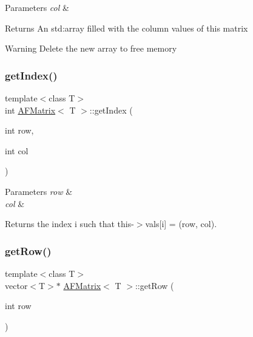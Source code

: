 \begin{DoxyParams}{Parameters}
{\em col} & \\
\hline
\end{DoxyParams}
\begin{DoxyReturn}{Returns}
An {\ttfamily std\+:array} filled with the column values of this matrix 
\end{DoxyReturn}
\begin{DoxyWarning}{Warning}
Delete the new array to free memory 
\end{DoxyWarning}
\mbox{\label{classAFMatrix_a582a394221722603e21b6571e95d69a7}} 
\subsubsection{\texorpdfstring{get\+Index()}{getIndex()}}
{\footnotesize\ttfamily template$<$class T$>$ \\
int \hyperlink{classAFMatrix}{A\+F\+Matrix}$<$ T $>$\+::get\+Index (\begin{DoxyParamCaption}\item[{int}]{row,  }\item[{int}]{col }\end{DoxyParamCaption})\hspace{0.3cm}{\ttfamily [inline]}}


\begin{DoxyParams}{Parameters}
{\em row} & \\
\hline
{\em col} & \\
\hline
\end{DoxyParams}
\begin{DoxyReturn}{Returns}
the index {\ttfamily i} such that {\ttfamily this-\/$>$vals\mbox{[}i\mbox{]} = (row, col)}. 
\end{DoxyReturn}
\mbox{\label{classAFMatrix_a2474e9ce55e4a2773291304e3c48af1f}} 
\subsubsection{\texorpdfstring{get\+Row()}{getRow()}}
{\footnotesize\ttfamily template$<$class T$>$ \\
vector$<$T$>$$\ast$ \hyperlink{classAFMatrix}{A\+F\+Matrix}$<$ T $>$\+::get\+Row (\begin{DoxyParamCaption}\item[{int}]{row }\end{DoxyParamCaption})\hspace{0.3cm}{\ttfamily [inline]}}


